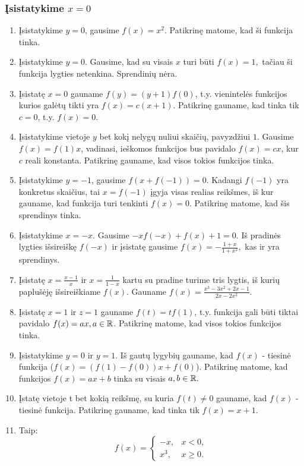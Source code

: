 \subsubsection*{Įsistatykime $x=0$}
\begin{enumerate} 
\item 
Įsistatykime $y=0$, gausime $f(x)=x^2$. Patikrinę matome, kad ši
funkcija tinka.
\item 
Įsistatykime $y=0.$ Gausime, kad su visais $x$ turi būti $f(x)=1,$
tačiau ši funkcija lygties netenkina. Sprendinių nėra.
\item 
Įsistatę $x=0$ gauname $f(y) = (y+1)f(0)$, t.y. vienintelės funkcijos
kurios galėtų tikti yra $f(x)=c(x+1)$. Patikrinę gauname, kad tinka tik
$c=0$, t.y. $f(x)=0$.
\item 
Įsistatykime vietoje $y$ bet kokį nelygų nuliui skaičių, pavyzdžiui
$1$. Gausime $f(x)=f(1)x$, vadinasi, ieškomos funkcijos bus pavidalo
$f(x)=cx$, kur $c$ reali konstanta. Patikrinę gauname, kad visos
tokios funkcijos tinka.
\item 
Įsistatykime $y=-1$, gausime $f(x+f(-1))=0$. Kadangi $f(-1)$ yra
konkretus skaičius, tai $x=f(-1)$ įgyja visas realias reikšmes, iš kur
gauname, kad funkcija turi tenkinti $f(x)=0$. Patikrinę matome, kad
šis sprendinys tinka.
\item 
Įsistatykime $x=-x.$ Gausime $-xf(-x) + f(x) + 1 = 0.$ Iš pradinės
lygties išsireiškę $f(-x)$ ir įsistatę gausime
$f(x)=-\frac{1+x}{1+x^2},$ kas ir yra sprendinys.
\item 
Įsistatę $x=\frac{x-1}{x}$ ir $x=\frac{1}{1-x}$ kartu su pradine turime
tris lygtis, iš kurių paplušėję išsireiškiame $f(x)$. Gauname
$f(x)=\frac{x^3-3x^2+2x-1}{2x-2x^2}$.
\item 
Įsistatę $x=1$ ir $z=1$ gauname $f(t) = tf(1)$, t.y. funkcija gali
būti tiktai pavidalo $f(x)=ax, a\in \mathbb R$. Patikrinę matome, kad visos
tokios funkcijos tinka.
\item 
Įsistatykime $y=0$ ir $y=1$. Iš gautų lygybių gauname, kad $f(x)$ -
tiesinė funkcija ($f(x) = (f(1)-f(0))x +f(0)$). Patikrinę matome, kad
funkcijos $f(x)=ax+b$ tinka su visais $a,b\in \mathbb R.$
\item 
Įstatę vietoje t bet kokią reikšmę, su kuria $f(t)\neq 0$ gauname, kad
$f(x)$ - tiesinė funkcija. Patikrinę gauname, kad tinka tik $f(x) = x
+ 1$.
\item 
Taip: $$f(x) = \begin{cases}-x,& x<0, \\ x^3,& x\geq 0.\end{cases}$$

\end{enumerate}
